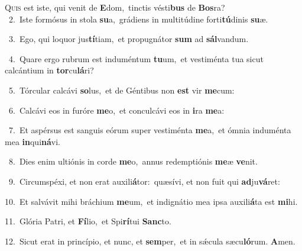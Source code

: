 \lettrine{\initial\textcolor{\initialcolor}{Q}}{uis} est iste, qui venit de \textbf{E}\-dom,~\star tinctis vésti\textbf{bus} de \textbf{Bos}\-ra?\\
{\numbfont\textcolor{\numbcolor}{~2.}}~Iste formósus in stola \textbf{su}\-a,~\star grádiens in multitúdine forti\-\textbf{tú}\-dinis \textbf{su}\-æ.\par
{\numbfont\textcolor{\numbcolor}{~3.}}~Ego, qui loquor jus\-\textbf{tí}\-tiam,~\star et propugnátor \textbf{sum} ad \textbf{sál}\-vandum.\par
{\numbfont\textcolor{\numbcolor}{~4.}}~Quare ergo rubrum est induméntum \textbf{tu}\-um,~\star et vestiménta tua sicut calcántium in \textbf{tor}\-cu\-\textbf{lá}\-ri?\par
{\numbfont\textcolor{\numbcolor}{~5.}}~Tórcular calcávi \textbf{so}\-lus,~\star et de Géntibus non \textbf{est} vir \textbf{me}\-cum:\par
{\numbfont\textcolor{\numbcolor}{~6.}}~Calcávi eos in furóre \textbf{me}\-o,~\star et conculcávi eos in \textbf{i}\-ra \textbf{me}\-a:\par
{\numbfont\textcolor{\numbcolor}{~7.}}~Et aspérsus est sanguis eórum super vestiménta \textbf{me}\-a,~\star et ómnia induménta mea \textbf{in}\-qui\-\textbf{ná}\-vi.\par
{\numbfont\textcolor{\numbcolor}{~8.}}~Dies enim ultiónis in corde \textbf{me}\-o,~\star annus redemptiónis \textbf{me}\-æ \textbf{ve}\-nit.\par
{\numbfont\textcolor{\numbcolor}{~9.}}~Circumspéxi, et non erat auxili\-\textbf{á}\-tor:~\star quæsívi, et non fuit qui \textbf{ad}\-ju\-\textbf{vá}\-ret:\par
{\numbfont\textcolor{\numbcolor}{10.}}~Et salvávit mihi bráchium \textbf{me}\-um,~\star et indignátio mea ipsa auxili\-\textbf{á}\-ta est \textbf{mi}\-hi.\par
{\numbfont\textcolor{\numbcolor}{11.}}~Glória Patri, et \textbf{Fí}\-lio,~\star et Spi\-\textbf{rí}\-tui \textbf{Sanc}\-to.\par
{\numbfont\textcolor{\numbcolor}{12.}}~Sicut erat in princípio, et nunc, et \textbf{sem}\-per,~\star et in sǽcula sæcu\-\textbf{ló}\-rum. \textbf{A}\-men.\par

